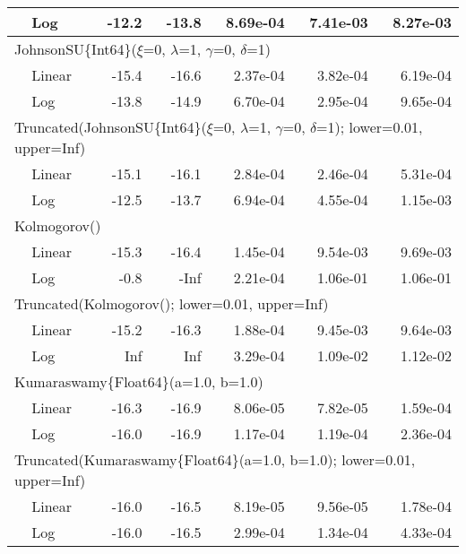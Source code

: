 \begin{tabular}{|llrrrrr|}
& Log & -12.2 & -13.8 & 8.69e-04 & 7.41e-03 & 8.27e-03\\
\hline
\multicolumn{7}{|l|}{JohnsonSU\{Int64\}($\xi$=0, $\lambda$=1, $\gamma$=0, $\delta$=1)}\\ \hline
& Linear & {\color{blue}-15.4} & {\color{blue}-16.6} & {\color{blue}2.37e-04} & 3.82e-04 & {\color{blue}6.19e-04}\\
& Log & -13.8 & -14.9 & 6.70e-04 & {\color{blue}2.95e-04} & 9.65e-04\\
\hline
\multicolumn{7}{|l|}{Truncated(JohnsonSU\{Int64\}($\xi$=0, $\lambda$=1, $\gamma$=0, $\delta$=1); lower=0.01, upper=Inf)}\\ \hline
& Linear & {\color{blue}-15.1} & {\color{blue}-16.1} & {\color{blue}2.84e-04} & {\color{blue}2.46e-04} & {\color{blue}5.31e-04}\\
& Log & -12.5 & -13.7 & 6.94e-04 & 4.55e-04 & 1.15e-03\\
\hline
\multicolumn{7}{|l|}{Kolmogorov()}\\ \hline
& Linear & {\color{blue}-15.3} & -16.4 & {\color{blue}1.45e-04} & {\color{blue}9.54e-03} & {\color{blue}9.69e-03}\\
& Log & -0.8 & {\color{blue}-Inf} & 2.21e-04 & 1.06e-01 & 1.06e-01\\
\hline
\multicolumn{7}{|l|}{Truncated(Kolmogorov(); lower=0.01, upper=Inf)}\\ \hline
& Linear & {\color{blue}-15.2} & {\color{blue}-16.3} & {\color{blue}1.88e-04} & {\color{blue}9.45e-03} & {\color{blue}9.64e-03}\\
& Log & Inf & Inf & 3.29e-04 & 1.09e-02 & 1.12e-02\\
\hline
\multicolumn{7}{|l|}{Kumaraswamy\{Float64\}(a=1.0, b=1.0)}\\ \hline
& Linear & {\color{blue}-16.3} & {\color{blue}-16.9} & {\color{blue}8.06e-05} & {\color{blue}7.82e-05} & {\color{blue}1.59e-04}\\
& Log & -16.0 & -16.9 & 1.17e-04 & 1.19e-04 & 2.36e-04\\
\hline
\multicolumn{7}{|l|}{Truncated(Kumaraswamy\{Float64\}(a=1.0, b=1.0); lower=0.01, upper=Inf)}\\ \hline
& Linear & -16.0 & -16.5 & {\color{blue}8.19e-05} & {\color{blue}9.56e-05} & {\color{blue}1.78e-04}\\
& Log & {\color{blue}-16.0} & {\color{blue}-16.5} & 2.99e-04 & 1.34e-04 & 4.33e-04\\
\hline
\end{tabular}